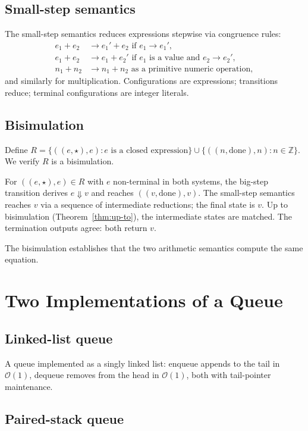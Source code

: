 \documentclass[twocolumn,11pt,a4paper]{article}
\newcommand{\Integer}{\mathbb{Z}}
\begin{document}
\subsection{Small-step semantics}

The small-step semantics reduces expressions stepwise via congruence rules:
\begin{align*}
e_1 + e_2 &\to e_1' + e_2 \text{ if } e_1 \to e_1', \\
e_1 + e_2 &\to e_1 + e_2' \text{ if } e_1 \text{ is a value and } e_2 \to e_2', \\
n_1 + n_2 &\to n_1 + n_2 \text{ as a primitive numeric operation},
\end{align*}
and similarly for multiplication. Configurations are expressions; transitions reduce; terminal configurations are integer literals.

\subsection{Bisimulation}

Define $R = \{((e, \star), e) : e \text{ is a closed expression}\} \cup \{((n, \mathrm{done}), n) : n \in \Integer\}$. We verify $R$ is a bisimulation.

For $((e, \star), e) \in R$ with $e$ non-terminal in both systems, the big-step transition derives $e \Downarrow v$ and reaches $((v, \mathrm{done}), v)$. The small-step semantics reaches $v$ via a sequence of intermediate reductions; the final state is $v$. Up to bisimulation (Theorem~\ref{thm:up-to}), the intermediate states are matched. The termination outputs agree: both return $v$.

The bisimulation establishes that the two arithmetic semantics compute the same equation.

\section{Two Implementations of a Queue}
\label{sec:queue-example}

\subsection{Linked-list queue}

A queue implemented as a singly linked list: enqueue appends to the tail in $\mathcal{O}(1)$, dequeue removes from the head in $\mathcal{O}(1)$, both with tail-pointer maintenance.

\subsection{Paired-stack queue}
\end{document}

